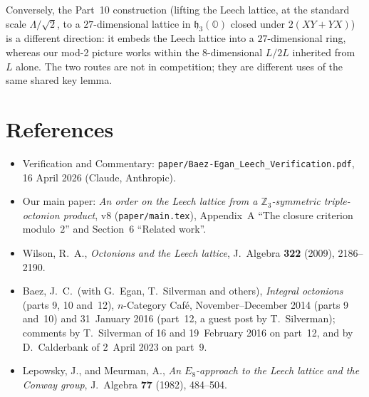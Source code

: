 \documentclass[11pt]{amsart}
\newcommand{\LL}{\Lambda}
\newcommand{\OO}{\mathbb{O}}
\newcommand{\ZZ}{\mathbb{Z}}
\begin{document}
Conversely, the Part~10 construction (lifting the Leech lattice, at the
standard scale $\LL/\sqrt{2}$, to a $27$-dimensional lattice in
$\mathfrak{h}_3(\OO)$ closed under $2(XY + YX)$) is a different
direction: it embeds the Leech lattice into a $27$-dimensional ring,
whereas our mod-2 picture works within the $8$-dimensional $L / 2L$
inherited from~$L$ alone.  The two routes are not in competition;
they are different uses of the same shared key lemma.

\section*{References}

\begin{itemize}
\item Verification and Commentary:
  \texttt{paper/Baez-Egan\_Leech\_Verification.pdf}, 16 April 2026
  (Claude, Anthropic).
\item Our main paper:
  \emph{An order on the Leech lattice from a $\ZZ_3$-symmetric
  triple-octonion product}, v8 (\texttt{paper/main.tex}), Appendix~A
  ``The closure criterion modulo~$2$'' and Section~6 ``Related work''.
\item Wilson, R.~A., \emph{Octonions and the Leech lattice},
  J.~Algebra \textbf{322} (2009), 2186--2190.
\item Baez, J.~C.\ (with G.~Egan, T.~Silverman and others),
  \emph{Integral octonions} (parts 9, 10 and~12),
  $n$-Category Caf\'e, November--December 2014 (parts 9 and~10) and
  31~January 2016 (part~12, a guest post by T.~Silverman); comments
  by T.~Silverman of 16 and 19~February 2016 on part~12, and by
  D.~Calderbank of 2~April 2023 on part~9.
\item Lepowsky, J., and Meurman, A., \emph{An $E_8$-approach to the
  Leech lattice and the Conway group}, J.~Algebra \textbf{77} (1982),
  484--504.
\end{itemize}
\end{document}
